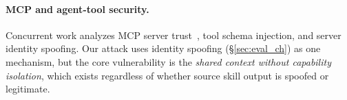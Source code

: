 \paragraph{MCP and agent-tool security.}
Concurrent work analyzes MCP server trust~\cite{anthropic2024mcp},
tool schema injection, and server identity spoofing.
Our attack uses identity spoofing (\S\ref{sec:eval_ch}) as one mechanism,
but the core vulnerability is the \emph{shared context without capability isolation},
which exists regardless of whether source skill output is spoofed or legitimate.
